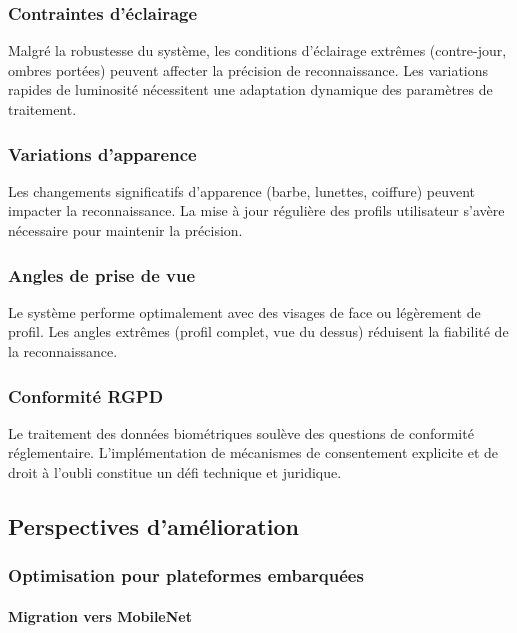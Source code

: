 \documentclass[12pt,a4paper]{article}
\begin{document}
\subsubsection{Contraintes d'éclairage}

Malgré la robustesse du système, les conditions d'éclairage extrêmes (contre-jour, ombres portées) peuvent affecter la précision de reconnaissance. Les variations rapides de luminosité nécessitent une adaptation dynamique des paramètres de traitement.

\subsubsection{Variations d'apparence}

Les changements significatifs d'apparence (barbe, lunettes, coiffure) peuvent impacter la reconnaissance. La mise à jour régulière des profils utilisateur s'avère nécessaire pour maintenir la précision.

\subsubsection{Angles de prise de vue}

Le système performe optimalement avec des visages de face ou légèrement de profil. Les angles extrêmes (profil complet, vue du dessus) réduisent la fiabilité de la reconnaissance.

\subsubsection{Conformité RGPD}

Le traitement des données biométriques soulève des questions de conformité réglementaire. L'implémentation de mécanismes de consentement explicite et de droit à l'oubli constitue un défi technique et juridique.

\subsection{Perspectives d'amélioration}

\subsubsection{Optimisation pour plateformes embarquées}

\paragraph{Migration vers MobileNet}
\end{document}
